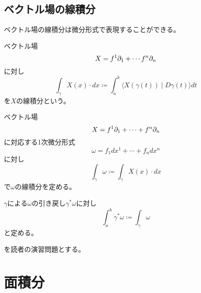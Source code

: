 \documentclass[report]{jlreq}
\begin{document}
\subsection{ベクトル場の線積分}

ベクトル場の線積分は微分形式で表現することができる。

\begin{definition}[ベクトル場の線積分]
    ベクトル場
    \begin{equation}
        X = f^1 \partial_1 + \cdots f^n \partial_n
    \end{equation}
    に対し
    \begin{equation}
        \int_{\gamma} X(x) \cdot dx
            \coloneqq \int_a^b \langle X(\gamma(t)) \mid D\gamma(t) \rangle dt
    \end{equation}
    を$X$の線積分という。
\end{definition}

\begin{definition}[微分形式による表現]
    ベクトル場
    \begin{equation}
        X = f^1 \partial_1 + \cdots + f^n \partial_n
    \end{equation}
    に対応する1次微分形式
    \begin{equation}
        \omega = f_1 dx^1 + \cdots + f_n dx^n
    \end{equation}
    に対し
    \begin{equation}
        \int_{\gamma} \omega
            \coloneqq \int_{\gamma} X(x) \cdot dx
    \end{equation}
    で$\omega$の線積分を定める。
\end{definition}

\begin{definition}[引き戻しの線積分]
    $\gamma$による$\omega$の引き戻し$\gamma^* \omega$に対し
    \begin{equation}
        \int_a^b \gamma^* \omega
            \coloneqq \int_\gamma \omega
    \end{equation}
    と定める。
\end{definition}


\begin{problem}[線積分]
    \cite[第IV章 問題5.1 (1)-(10)]{杉浦+89}を読者の演習問題とする。
\end{problem}




%
\section{面積分}
\end{document}
